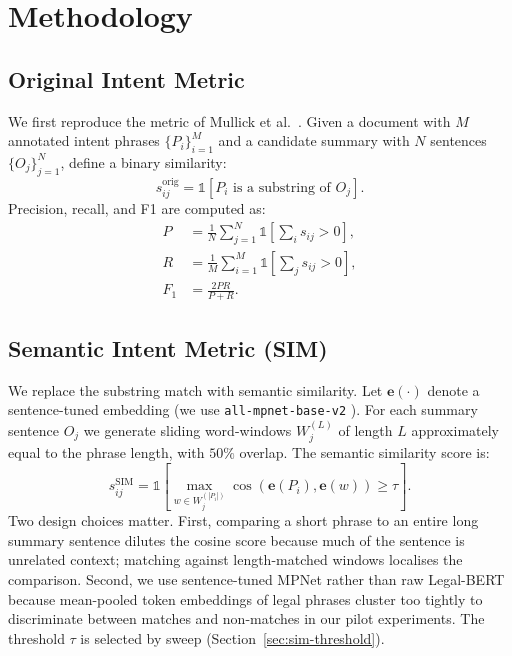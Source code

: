 \documentclass[conference,a4paper]{IEEEtran}
\begin{document}
\section{Methodology}

\subsection{Original Intent Metric}
We first reproduce the metric of Mullick et al.~\cite{mullick2022}. Given a document with $M$ annotated intent phrases $\{P_i\}_{i=1}^{M}$ and a candidate summary with $N$ sentences $\{O_j\}_{j=1}^{N}$, define a binary similarity:
\begin{equation}
s_{ij}^{\text{orig}} = \mathbb{1}\!\left[P_i \text{ is a substring of } O_j\right].
\end{equation}
Precision, recall, and F1 are computed as:
\begin{align}
P &= \frac{1}{N} \sum_{j=1}^{N} \mathbb{1}\!\left[\textstyle\sum_i s_{ij} > 0\right], \\
R &= \frac{1}{M} \sum_{i=1}^{M} \mathbb{1}\!\left[\textstyle\sum_j s_{ij} > 0\right], \\
F_1 &= \frac{2 P R}{P + R}.
\end{align}

\subsection{Semantic Intent Metric (SIM)}
We replace the substring match with semantic similarity. Let $\mathbf{e}(\cdot)$ denote a sentence-tuned embedding (we use \texttt{all-mpnet-base-v2} \cite{reimers2019sentencebert, song2020mpnet}). For each summary sentence $O_j$ we generate sliding word-windows $W_j^{(L)}$ of length $L$ approximately equal to the phrase length, with $50\%$ overlap. The semantic similarity score is:
\begin{equation}
s_{ij}^{\text{SIM}} = \mathbb{1}\!\left[\max_{w \in W_j^{(|P_i|)}} \cos\!\left(\mathbf{e}(P_i), \mathbf{e}(w)\right) \ge \tau \right].
\end{equation}
Two design choices matter. First, comparing a short phrase to an entire long summary sentence dilutes the cosine score because much of the sentence is unrelated context; matching against length-matched windows localises the comparison. Second, we use sentence-tuned MPNet rather than raw Legal-BERT because mean-pooled token embeddings of legal phrases cluster too tightly to discriminate between matches and non-matches in our pilot experiments. The threshold $\tau$ is selected by sweep (Section~\ref{sec:sim-threshold}).
\end{document}
